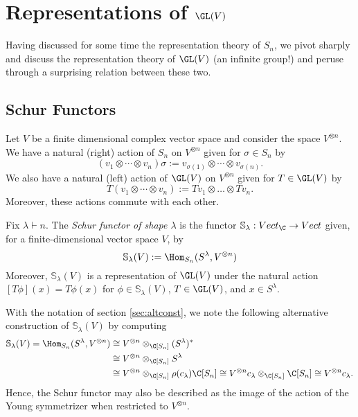 \documentclass[../main.tex]{subfiles}
\begin{document}
\section{Representations of $ \GL(V) $}

Having discussed for some time the representation theory of $ S_{n} $, we pivot sharply and discuss the representation theory of $ \GL(V) $ (an infinite group!) and peruse through a surprising relation between these two.

\subsection{Schur Functors}

Let $ V $ be a finite dimensional complex vector space and consider the space $ V^{\otimes n} $. We have a natural (right) action of $ S_{n} $ on $ V^{\otimes n} $ given for $ \sigma\in S_{n} $ by 
\[
    (v_{1}\otimes \cdots \otimes v_{n}) \sigma := v_{\sigma(1)}\otimes \cdots \otimes v_{\sigma(n)}.
\]
We also have a natural (left) action of $ \GL(V) $ on $ V^{\otimes n} $ given for $ T\in \GL(V) $ by
\[
    T(v_{1} \otimes \cdots \otimes v_{n}) := Tv_{1} \otimes \dots \otimes Tv_{n}.
\]
Moreover, these actions commute with each other.


\begin{definition}
    Fix $ \lambda\vdash n $. The \textit{Schur functor of shape $\lambda$} is the functor $ \mathbb{S}_{\lambda}:Vect_{\C}\to Vect$
    given, for a finite-dimensional vector space $ V $, by
    \[
        \mathbb{S}_{\lambda}(V) := \Hom_{S_{n}}(S^{\lambda}, V^{\otimes n})
    \]
    Moreover, $ \mathbb{S}_{\lambda}(V)$ is a representation of $ \GL(V) $ under the natural action $ [T \phi](x) = T \phi(x) $ for $ \phi\in \mathbb{S}_{\lambda}(V) $, $ T\in\GL(V) $, and $ x\in S^{\lambda} $.
\end{definition}
With the notation of section \ref{sec:altconst}, we note the following alternative construction of $ \mathbb{S}_{\lambda}(V) $ by computing
\begin{align*}
    \mathbb{S}_{\lambda}(V) = \Hom_{S_{n}}(S^{\lambda},V^{\otimes n}) &\cong V^{\otimes n}\otimes_{\C[S_{n}]}(S^{\lambda})^{*} \\
    &\cong V^{\otimes n}\otimes_{\C[S_{n}]}S^{\lambda} \\
    &\cong V^{\otimes n}\otimes_{\C[S_{n}]}\rho(c_{\lambda})\C[S_{n}]  \cong V^{\otimes n} c_{\lambda}\otimes_{\C[S_{n}]} \C[S_{n}]  \cong V^{\otimes n}c_{\lambda}.
\end{align*}
Hence, the Schur functor may also be described as the image of the action of the Young symmetrizer when restricted to $ V^{\otimes n} $.
\end{document}
